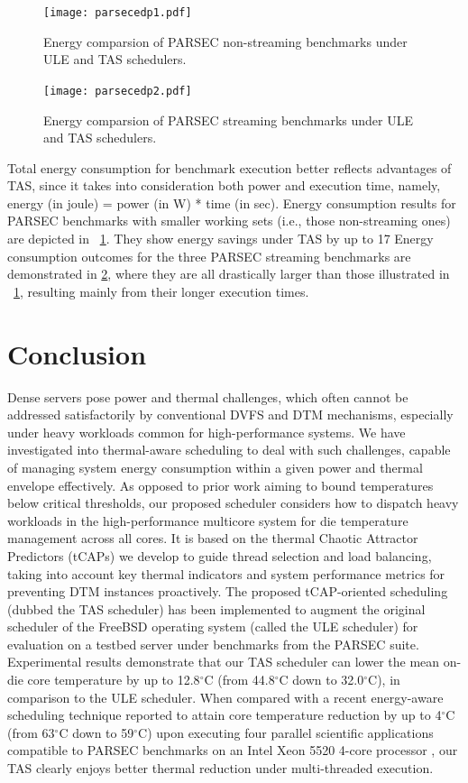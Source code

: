 \documentclass[times, 10pt,twocolumn]{IEEEtran}
\begin{document}
\begin{figure}[!tbp]
  \centering
  \texttt{[image: parsecedp1.pdf]}
  \caption{Energy comparsion of PARSEC non-streaming benchmarks under ULE and TAS
    schedulers.}
  \label{fig:pedpsmall}
\end{figure}
\begin{figure}[!tp]
  \centering
  \texttt{[image: parsecedp2.pdf]}
  \caption{Energy comparsion of PARSEC streaming benchmarks under ULE and TAS
    schedulers.}
  \label{fig:pedpstreaming}
\end{figure}
Total energy consumption for benchmark execution better reflects advantages of TAS,
since it takes into consideration both power and execution time,
namely, energy (in joule) = power (in W) * time (in sec).
Energy consumption results for PARSEC benchmarks with smaller working sets
(i.e., those non-streaming ones) are depicted in \figurename~\ref{fig:pedpsmall}.
They show energy savings under TAS by up to 17%
Energy consumption outcomes for the three PARSEC streaming benchmarks
are demonstrated in \ref{fig:pedpstreaming}, where they are all drastically
larger than those illustrated in \figurename~\ref{fig:pedpsmall},
resulting mainly from their longer execution times. 


\section{Conclusion}
\label{sec:conclusion}
Dense servers pose power and thermal challenges, which often cannot be
addressed satisfactorily by conventional DVFS and DTM mechanisms,
especially under heavy workloads common for high-performance systems.
We have investigated into thermal-aware scheduling to deal with such
challenges, capable of managing system energy consumption within a given
power and thermal envelope effectively.  As opposed to prior work aiming
to bound temperatures below critical thresholds, our proposed scheduler
considers how to dispatch heavy workloads in the high-performance
multicore system for die temperature management across all cores.  It
is based on the thermal Chaotic Attractor Predictors (tCAPs) we develop
to guide thread selection and load balancing, taking into account key
thermal indicators and system performance metrics for preventing DTM
instances proactively.  The proposed tCAP-oriented scheduling (dubbed
the TAS scheduler) has been implemented to augment the original
scheduler of the FreeBSD operating system (called the ULE scheduler) for
evaluation on a testbed server under benchmarks from the PARSEC suite.
Experimental results demonstrate that our TAS scheduler can lower the
mean on-die core temperature by up to 12.8$^{\circ}$C (from 44.8$^\circ$C
down to 32.0$^\circ$C), in comparison to the ULE
scheduler.  When compared with a recent energy-aware scheduling
technique reported to attain core temperature reduction by up to
4$^\circ$C (from 63$^\circ$C down to 59$^\circ$C) upon executing four
parallel scientific applications compatible to PARSEC benchmarks on an
Intel Xeon 5520 4-core processor \cite{Sarood2011}, our TAS clearly
enjoys better thermal reduction under multi-threaded execution.

\label{sec:references}
\begin{small}


\end{small}
\end{document}
